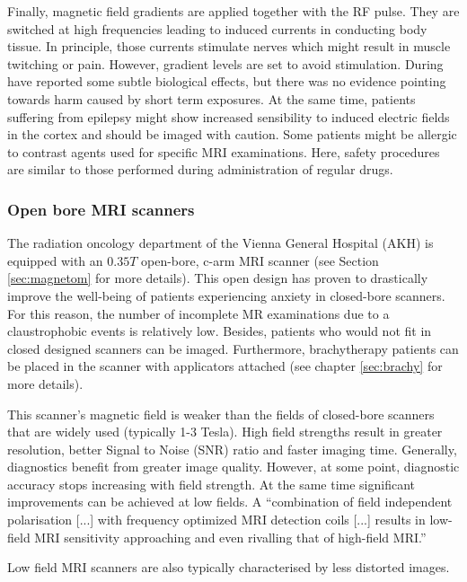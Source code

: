 Finally, magnetic field gradients are applied together with the RF pulse.
They are switched at high frequencies leading to induced currents in conducting body tissue.
In principle, those currents stimulate nerves which might result in muscle twitching or pain.
However, gradient levels are set to avoid stimulation.
During have reported some subtle biological effects, but there was no evidence pointing towards harm caused by short term exposures.
At the same time, patients suffering from epilepsy might show increased sensibility to induced electric fields in the cortex and should be imaged with caution. \cite{Maidment2014}
Some patients might be allergic to contrast agents used for specific MRI examinations.
Here, safety procedures are similar to those performed during administration of regular drugs. 

\subsubsection{Open bore MRI scanners}

The radiation oncology department of the Vienna General Hospital (AKH) is equipped with an $0.35  T$ open-bore, c-arm MRI scanner (see Section \ref{sec:magnetom} for more details).
This open design has proven to drastically improve the well-being of patients experiencing anxiety in closed-bore scanners.
For this reason, the number of incomplete MR examinations due to a claustrophobic events is relatively low. \cite{Enders2011a, Bangard2007}
Besides, patients who would not fit in closed designed scanners can be imaged.
Furthermore, brachytherapy patients can be placed in the scanner with applicators attached (see chapter \ref{sec:brachy} for more details).

This scanner's magnetic field is weaker than the fields of closed-bore scanners that are widely used (typically 1-3 Tesla).
High field strengths result in greater resolution, better Signal to Noise (SNR) ratio and faster imaging time.
Generally, diagnostics benefit from greater image quality.
However, at some point, diagnostic accuracy stops increasing with field strength.
At the same time significant improvements can be achieved at low fields.
A ``combination of field independent polarisation [...] with frequency optimized MRI detection coils [...] results in low-field MRI sensitivity approaching and even rivalling that of high-field MRI.'' \cite{Coffey2013}

Low field MRI scanners are also typically characterised by less distorted images. \cite{https://link.springer.com/article/10.1007/PL00002385}

